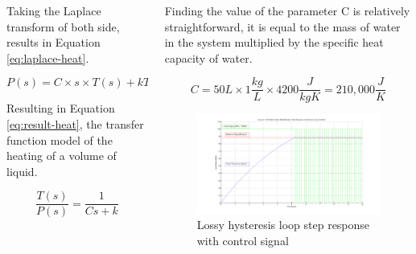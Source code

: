 \documentclass[final]{beamer}
\newlength{\onecolwid}
\newlength{\twocolwid}
\begin{document}
\begin{frame}[t]
\begin{columns}[t]
\begin{column}{\twocolwid}
\begin{columns}[t,totalwidth=\twocolwid]
\begin{column}{\onecolwid}
Taking the Laplace transform of both side, results in Equation \ref{eq:laplace-heat}.

\begin{equation}
P(s) = C \times s \times T(s) + kT(s)
\label{eq:laplace-heat}
\end{equation}

\noindent Resulting in Equation \ref{eq:result-heat}, the transfer function model of the heating of a volume of liquid.

\begin{equation}
\frac{T(s)}{P(s)} = \frac{1}{Cs + k}
\label{eq:result-heat}
\end{equation}


\end{column} %

\begin{column}{\onecolwid} %
\noindent  Finding the value of the parameter C is relatively straightforward, it is equal to the mass of water in the system multiplied by the specific heat capacity of water.

\begin{equation}
C = 50L \times 1\frac{kg}{L} \times 4200\frac{J}{kgK} = 210,000\frac{J}{K}
\label{eq:value-heat}
\end{equation}

\begin{figure}
\includegraphics[width=\linewidth]{hysteresis-step-lossy.png}
\caption{Lossy hysteresis loop step response with control signal}
\end{figure}


\end{column}
\end{columns}
\end{column}
\end{columns}
\end{frame}
\end{document}

